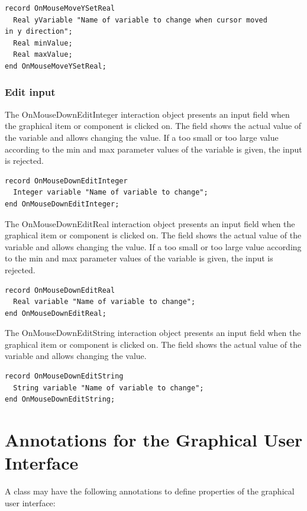 \documentclass[10pt,a4paper]{report}
\def\doublelabel#1{\label{#1}\hypertarget{#1}{}}
\begin{document}
\begin{lstlisting}[language=modelica]
record OnMouseMoveYSetReal
  Real yVariable "Name of variable to change when cursor moved
in y direction";
  Real minValue;
  Real maxValue;
end OnMouseMoveYSetReal;
\end{lstlisting}
\subsubsection{Edit input}\doublelabel{edit-input}

The OnMouseDownEditInteger interaction object presents an input field
when the graphical item or component is clicked on. The field shows the
actual value of the variable and allows changing the value. If a too
small or too large value according to the min and max parameter values
of the variable is given, the input is rejected.

\begin{lstlisting}[language=modelica]
record OnMouseDownEditInteger
  Integer variable "Name of variable to change";
end OnMouseDownEditInteger;
\end{lstlisting}
The OnMouseDownEditReal interaction object presents an input field when
the graphical item or component is clicked on. The field shows the
actual value of the variable and allows changing the value. If a too
small or too large value according to the min and max parameter values
of the variable is given, the input is rejected.

\begin{lstlisting}[language=modelica]
record OnMouseDownEditReal
  Real variable "Name of variable to change";
end OnMouseDownEditReal;
\end{lstlisting}
The OnMouseDownEditString interaction object presents an input field
when the graphical item or component is clicked on. The field shows the
actual value of the variable and allows changing the value.

\begin{lstlisting}[language=modelica]
record OnMouseDownEditString
  String variable "Name of variable to change";
end OnMouseDownEditString;
\end{lstlisting}
\section{Annotations for the Graphical User Interface}\doublelabel{annotations-for-the-graphical-user-interface}

A class may have the following annotations to define properties of the
graphical user interface:
\end{document}
